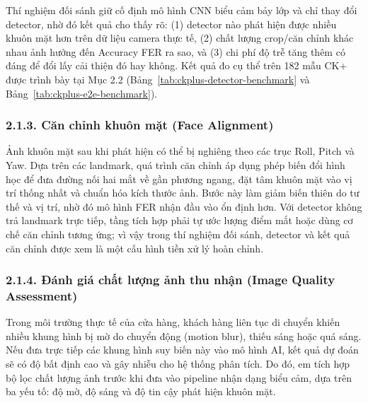 Thí nghiệm đối sánh giữ cố định mô hình CNN biểu cảm bảy lớp và chỉ thay đổi detector, nhờ đó kết quả cho thấy rõ: (1) detector nào phát hiện được nhiều khuôn mặt hơn trên dữ liệu camera thực tế, (2) chất lượng crop/căn chỉnh khác nhau ảnh hưởng đến Accuracy FER ra sao, và (3) chi phí độ trễ tăng thêm có đáng để đổi lấy cải thiện đó hay không. Kết quả đo cụ thể trên 182 mẫu CK+ được trình bày tại Mục 2.2 (Bảng~\ref{tab:ckplus-detector-benchmark} và Bảng~\ref{tab:ckplus-e2e-benchmark}).

\subsubsection*{2.1.3. Căn chỉnh khuôn mặt (Face Alignment)}

Ảnh khuôn mặt sau khi phát hiện có thể bị nghiêng theo các trục Roll, Pitch và Yaw. Dựa trên các landmark, quá trình căn chỉnh áp dụng phép biến đổi hình học để đưa đường nối hai mắt về gần phương ngang, đặt tâm khuôn mặt vào vị trí thống nhất và chuẩn hóa kích thước ảnh. Bước này làm giảm biến thiên do tư thế và vị trí, nhờ đó mô hình FER nhận đầu vào ổn định hơn. Với detector không trả landmark trực tiếp, tầng tích hợp phải tự ước lượng điểm mắt hoặc dùng cơ chế căn chỉnh tương ứng; vì vậy trong thí nghiệm đối sánh, detector và kết quả căn chỉnh được xem là một cấu hình tiền xử lý hoàn chỉnh.


\subsubsection*{2.1.4. Đánh giá chất lượng ảnh thu nhận (Image Quality Assessment)}

Trong môi trường thực tế của cửa hàng, khách hàng liên tục di chuyển khiến nhiều khung hình bị mờ do chuyển động (motion blur), thiếu sáng hoặc quá sáng. Nếu đưa trực tiếp các khung hình suy biến này vào mô hình AI, kết quả dự đoán sẽ có độ bất định cao và gây nhiễu cho hệ thống phân tích. Do đó, em tích hợp bộ lọc chất lượng ảnh trước khi đưa vào pipeline nhận dạng biểu cảm, dựa trên ba yếu tố: độ mờ, độ sáng và độ tin cậy phát hiện khuôn mặt.

